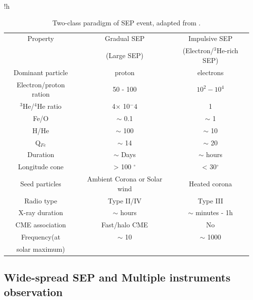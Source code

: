 \begin{table}{!h}
	\centering
	\caption[Two classes of SEP events]{Two-class paradigm of \ac{SEP} event, adapted from \citet{kallenrode2003current,	Desai_Diacalone2016LRSP, Wang2009}.}
	\begin{tabular}{c|c|c}
		\hline
		\hline
		Property 	& Gradual \ac{SEP} 	& Impulsive \ac{SEP} \\
					& (Large \ac{SEP})	& (Electron/$^3$He-rich \ac{SEP}) \\
		\hline
		Dominant particle	& proton	& electrons \\
		Electron/proton ration &  50 - 100 &  $10^2 - 10^4$  \\
		$^3$He/$^4$He ratio	& 4$\times$ 10$^-4$ & 1 \\
		Fe/O			& $\sim$ 0.1			& $\sim$ 1	 \\
		H/He		 	& $\sim$ 100			& $\sim$ 10 \\
		Q$_{Fe}$		& $\sim$ 14 			& $\sim$ 20 \\
		Duration		& $\sim$ Days			& $\sim$ hours \\
		Longitude cone	& > 100 $^\circ$		& < 30$^\circ$ \\
		Seed particles	& Ambient Corona or Solar wind & Heated corona \\
		Radio type		& Type II/IV	& Type III \\
		X-ray duration	& $\sim$ hours	& $\sim$ minutes - 1h \\
		CME association	& Fast/halo CME	& No	\\
		Frequency(at 	& $\sim$ 10	& $\sim$ 1000 \\
		solar maximum)	& 	& 	\\
		\hline
	\end{tabular}
	\label{Tab:Two_type_SEP}
\end{table}


\subsection{Wide-spread SEP and Multiple instruments observation}


